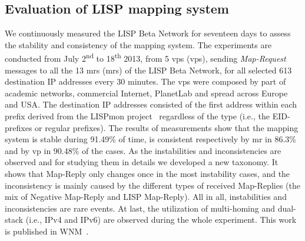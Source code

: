 \subsection{Evaluation of LISP mapping system}
We continuously measured the LISP Beta Network for seventeen days to assess the stability and consistency of the mapping system. The experiments are conducted from July 2\textsuperscript{nd} to 18\textsuperscript{th} 2013, from 5 \acrlong{vp}s (\acrshort{vp}s), sending \emph{Map-Request} messages to all the 13 \acrlong{mr}s (\acrshort{mr}s) of the LISP Beta Network, for all selected 613 destination IP addresses every 30 minutes. The \acrshort{vp}s were composed by part of academic networks, commercial Internet, PlanetLab and spread across Europe and USA. The destination IP addresses consisted of the first address within each prefix derived from the LISPmon project~\cite{lispmon} regardless of the type (i.e., the EID-prefixes or regular prefixes). The results of measurements show that the mapping system is stable during 91.49\% of time, is consistent respectively by \acrshort{mr} in 86.3\% and by \acrshort{vp} in 90.48\% of the cases. As the instabilities and inconsistencies are observed and for studying them in details we developed a new taxonomy. It shows that Map-Reply only changes once in the most instability cases, and the inconsistency is mainly caused by the different types of received Map-Replies (the mix of Negative Map-Reply and LISP Map-Reply). All in all, instabilities and inconsistencies are rare events. At last, the utilization of multi-homing and dual-stack (i.e., IPv4 and IPv6) are observed during the whole experiment. This work is published in WNM~\cite{yue2016stability}.

